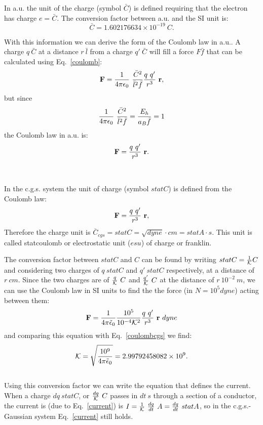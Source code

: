 \documentclass[12pt,a4paper]{article}
\def\barc{1.602176634\times 10^{-19}}
\def\kappa{2.99792458082\times 10^{9}}
\begin{document}
{\color{web-blue} In a.u. the unit of the charge (symbol $\bar C$) is
defined requiring that the electron has charge $e=\bar C$. The conversion 
factor between a.u. and the SI unit is: 
\begin{equation}
\bar C=\barc\ C.
\end{equation}

With this information we can derive the form of the Coulomb law in a.u..
A charge $q\ \bar C$ at a distance $r\ \bar l$ from a
charge $q'\ \bar C$ will fill a force $F \bar f$ that can be 
calculated using Eq.~\ref{coulomb}:
\begin{equation}
{\bf F} = {1\over 4 \pi \epsilon_0}\ {\bar C^2 \over \bar l^2 \bar f} 
{q\ q' \over r^3}\ {\bf r},
\end{equation}
but since
\begin{equation}
{1\over 4 \pi \epsilon_0}\ {\bar C^2 \over \bar l^2\bar f} = 
{E_h \over a_B \bar f}=1
\end{equation}
the Coulomb law in a.u. is:
\begin{equation}
{\bf F} = {q\ q' \over r^3}\ {\bf r}. 
\end{equation}
}
\\

{\color{orange} In the c.g.s. system the unit of charge (symbol $statC$)
is defined from the Coulomb law:
\begin{equation}
{\bf F} = {q\ q'\over r^3}\ {\bf r},
\label{coulombcgs}
\end{equation}
Therefore the charge unit is $\bar C_{cgs}=statC=\sqrt{dyne}\cdot cm=
statA\cdot s$. This unit is called statcoulomb 
or electrostatic unit ($esu$) of charge or franklin.

The conversion factor between $statC$ and $C$ can be found by writing
$statC={1\over \mathcal{K}} C$ and considering two charges of $q\ statC$ and 
$q'\ statC$ respectively, at a distance of $r\ cm$. Since the two charges are
of ${q\over \mathcal{K}}\ C$ and ${q'\over \mathcal{K}}\ C$ at the distance of $r\ 10^{-2}\ m$,
we can use the Coulomb law in SI units to find the 
the force (in $N=10^5 dyne$) acting between them: 
\begin{equation}
{\bf F}={1\over 4 \pi \tilde \epsilon_0} {10^5\over 10^{-4} \mathcal{K}^2} 
{q\ q'\over r^3}\ {\bf r}\ dyne
\end{equation}
and comparing this equation with Eq.~\ref{coulombcgs} we find:
\begin{equation}
\mathcal{K}= \sqrt{10^9 \over 4 \pi \tilde \epsilon_0}= \kappa. 
\end{equation}
\\
Using this conversion factor we can write the equation that defines 
the current.  When a charge $dq\ statC$, or ${dq\over \mathcal{K}}\ C$ passes in $dt\ s$
through a section of a conductor, the current is (due to Eq.~\ref{current})
is $I={1\over \mathcal{K}}\ {dq\over dt}\ A= {dq\over dt}\ statA$, so in the 
c.g.s.-Gaussian system Eq.~\ref{current} still holds.   
}
\\
\end{document}
